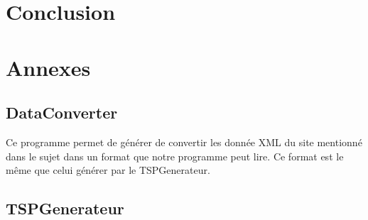 \documentclass[10pt,a4paper]{report}
\begin{document}
\section{Conclusion}
\section{Annexes}

	\subsection{DataConverter}
	\begin{flushleft}
	Ce programme permet de générer de convertir les donnée XML du site mentionné dans le sujet dans un format que notre programme peut lire. Ce format est le même que celui générer par le TSPGenerateur.
	\end{flushleft}
	
	\subsection{TSPGenerateur}
\end{document}
